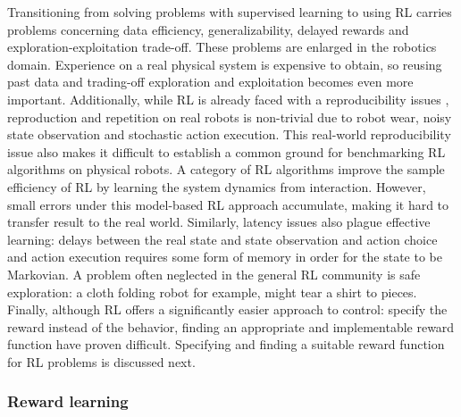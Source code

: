 \documentclass[\home/main.tex]{subfiles}
\begin{document}
Transitioning from solving problems with supervised learning to using RL carries problems concerning data efficiency, generalizability, delayed rewards and exploration-exploitation trade-off. These problems are enlarged in the robotics domain.
Experience on a real physical system is expensive to obtain, so reusing past data and trading-off exploration and exploitation becomes even more important.
Additionally, while RL is already faced with a reproducibility issues \autocite{henderson2018deep}, reproduction and repetition on real robots is non-trivial due to robot wear, noisy state observation and stochastic action execution. This real-world reproducibility issue also makes it difficult to establish a common ground for benchmarking RL algorithms on physical robots.
A category of RL algorithms improve the sample efficiency of RL by learning the system dynamics from interaction. However, small errors under this model-based RL approach accumulate, making it hard to transfer result to the real world.
Similarly, latency issues also plague effective learning: delays between the real state and state observation and action choice and action execution requires some form of memory in order for the state to be Markovian.
A problem often neglected in the general RL community is safe exploration: a cloth folding robot for example, might tear a shirt to pieces.
Finally, although RL offers a significantly easier approach to control: specify the reward instead of the behavior, finding an appropriate and implementable reward function have proven difficult. Specifying and finding a suitable reward function for RL problems is discussed next.

\subsubsection{Reward learning}  \label{subsec:lit_reward_learning}
\end{document}
